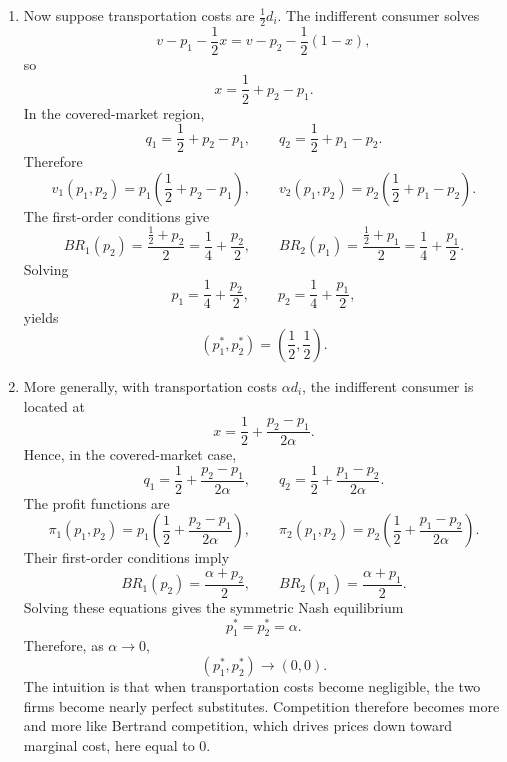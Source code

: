 \documentclass[12pt,a4paper]{article}
\begin{document}
\begin{enumerate}[label=(\alph*)]
  \item Now suppose transportation costs are $\frac12 d_i$. The indifferent consumer solves
  \[
      v-p_1-\frac12 x=v-p_2-\frac12(1-x),
  \]
  so
  \[
      x=\frac12+p_2-p_1.
  \]
  In the covered-market region,
  \[
      q_1=\frac12+p_2-p_1,
      \qquad
      q_2=\frac12+p_1-p_2.
  \]
  Therefore
  \[
      v_1(p_1,p_2)=p_1\left(\frac12+p_2-p_1\right),
      \qquad
      v_2(p_1,p_2)=p_2\left(\frac12+p_1-p_2\right).
  \]
  The first-order conditions give
  \[
      BR_1(p_2)=\frac{\frac12+p_2}{2}=\frac14+\frac{p_2}{2},
      \qquad
      BR_2(p_1)=\frac{\frac12+p_1}{2}=\frac14+\frac{p_1}{2}.
  \]
  Solving
  \[
      p_1=\frac14+\frac{p_2}{2},
      \qquad
      p_2=\frac14+\frac{p_1}{2},
  \]
  yields
  \[
      (p_1^*,p_2^*)=\left(\frac12,\frac12\right).
  \]

  \item More generally, with transportation costs $\alpha d_i$, the indifferent consumer is located at
  \[
      x=\frac12+\frac{p_2-p_1}{2\alpha}.
  \]
  Hence, in the covered-market case,
  \[
      q_1=\frac12+\frac{p_2-p_1}{2\alpha},
      \qquad
      q_2=\frac12+\frac{p_1-p_2}{2\alpha}.
  \]
  The profit functions are
  \[
      \pi_1(p_1,p_2)=p_1\left(\frac12+\frac{p_2-p_1}{2\alpha}\right),
      \qquad
      \pi_2(p_1,p_2)=p_2\left(\frac12+\frac{p_1-p_2}{2\alpha}\right).
  \]
  Their first-order conditions imply
  \[
      BR_1(p_2)=\frac{\alpha+p_2}{2},
      \qquad
      BR_2(p_1)=\frac{\alpha+p_1}{2}.
  \]
  Solving these equations gives the symmetric Nash equilibrium
  \[
      p_1^*=p_2^*=\alpha.
  \]
  Therefore, as $\alpha\to 0$,
  \[
      (p_1^*,p_2^*)\to(0,0).
  \]
  The intuition is that when transportation costs become negligible, the two firms become nearly perfect substitutes. Competition therefore becomes more and more like Bertrand competition, which drives prices down toward marginal cost, here equal to $0$.
\end{enumerate}

\end{document}
